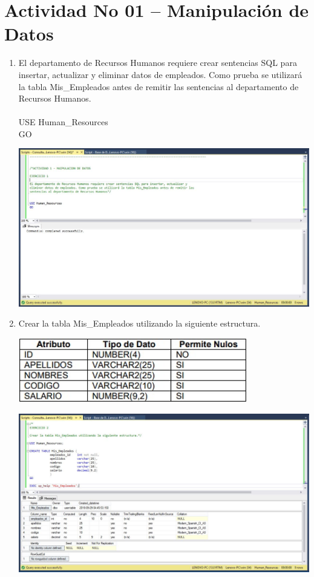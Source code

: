 \section{Actividad No 01 – Manipulaci\'on de Datos} 

\begin{enumerate}[1.]

	\item El departamento de Recursos Humanos requiere crear sentencias SQL para insertar, actualizar y eliminar datos de empleados. Como prueba se utilizará la tabla Mis\_Empleados antes de remitir las sentencias al departamento de Recursos Humanos.
	\\
	\\USE Human\_Resources
	\\GO\\

	\begin{center}
	\includegraphics[width=17cm]{./Imagenes/Actividad1-Ejercicio01} 
	\end{center}

	\item Crear la tabla Mis\_Empleados utilizando la siguiente estructura.
	\begin{center}
	\includegraphics[width=10cm]{./Imagenes/Actividad1-Ejercicio02Tabla} 
	\end{center}

	\begin{center}
	\includegraphics[width=17cm]{./Imagenes/Actividad1-Ejercicio02} 
	\end{center}



\end{enumerate}
